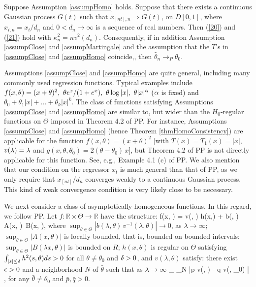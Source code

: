 \begin{thm}  Suppose Assumption \ref{assumpHomo} holds. Suppose that there exists a continuous Gaussian process $G(t)$ such that $x_{[nt], n} \Rightarrow G(t)$, on $D[0,1]$, where $x_{i,n} = x_i / d_n$  and $0 < d_n \to \infty$ is a sequence of real numbers.
Then (\ref {20}) and (\ref {21}) hold with $\kappa^2_n=nv^2(d_n)$. Consequently,
if in addition Assumption \ref{assumpClose} and \ref{assumpMartingale} and the assumption that the $T$'s in \ref{assumpClose} and \ref{assumpHomo} coincide,, then $\hat{\theta}_n \rightarrow_P \theta_0$.
\end{thm}


Assumptions \ref{assumpClose} and \ref{assumpHomo} are quite general, including many commonly used regression functions. Typical examples include $f(x, \theta)=(x+\theta)^2,\ \theta e^{x}/(1 + e^x),\ \theta \log |x|,\ \theta |x|^\alpha$ ($\alpha$ is fixed) and $\theta_0+\theta_1 |x|+...+\theta_k|x|^k$.
The class of functions satisfying Assumptions \ref{assumpClose} and \ref{assumpHomo} are similar to, but wider than the  $H_0$-regular functions on $\Theta$ imposed in Theorem 4.2 of PP. For instance,   Assumptions \ref{assumpClose} and \ref{assumpHomo} (hence Theorem \ref{thmHomoConsistency}) are applicable for   the function $f(x, \theta)=(x+\theta)^2$  [with $T(x)= T_1(x)=|x|$, $v(\lambda)=\lambda$ and $g(x, \theta, \theta_0)=2(\theta-\theta_0)\, x$], but Theorem 4.2 of PP is not  directly applicable for this function. See, e.g., Example 4.1 (c) of PP. We also mention that our condition on the regressor $x_t$ is much general than that of PP, as we only require that $x_{[nt]} / d_n$ converges weakly to a continuous Gaussian  process. This kind of weak convergence condition is very likely close to be necessary.

\medskip
We next consider  a class of asymptotically homogeneous functions. In this regard, we follow PP. Let $f:\mathbb{R} \times \Theta \rightarrow \mathbb{R} $ have the structure:
 \be
 f(\lambda x, \theta) = v(\lambda, \theta) h(x,\theta) + b(\lambda, \theta)\, A(x, \theta)\, B(\lambda x, \theta), 
 \ee
 where $\sup_{\theta\in \Theta}|b(\lambda, \theta)\, v^{-1}(\lambda, \theta)|\to 0$, as $\lambda\to \infty$; $\sup_{\theta\in \Theta}|A(x, \theta)|$ is locally bounded, that is, bounded on bounded intervals;
 $\sup_{\theta\in \Theta} |B(\lambda x, \theta)|$ is bounded on $R$; $h(x, \theta)$ is regular on $\Theta$ satisfying $\int_{|s| \le \delta} h^2(s, \theta)  ds > 0$   for all $\theta \ne \theta_0$ and $\delta > 0$,  and $v(\lambda, \theta)$ satisfy:   there exist $\epsilon > 0$ and a neighborhood $N$ of $\bar{\theta}$ such that as $\lambda \to \infty$
\be
\inf_{} \inf_{\theta \in N} |p v(\lambda, \theta) - q v(\lambda, \theta_0) | \to \infty,
\ee
for any $\bar{\theta} \ne \theta_0$ and $\bar{p}, \bar{q} > 0$.


